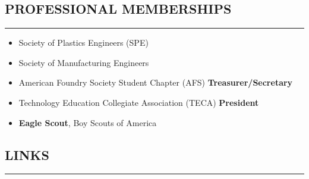 \documentclass[11pt,letterpaper]{article}
\begin{document}
\subsection*{PROFESSIONAL MEMBERSHIPS}
	\vspace{-0.5em}
	\hrule
	\vspace{0.8em}
	\begin{itemize}
		\item Society of Plastics Engineers (SPE)
		\item Society of Manufacturing Engineers
		\item American Foundry Society Student Chapter (AFS) \textbf{Treasurer/Secretary}
		\item Technology Education Collegiate Association (TECA) \textbf{President}
		\item \textbf{Eagle Scout}, Boy Scouts of America
	\end{itemize}
	
\subsection*{LINKS}
	\vspace{-0.5em}
	\hrule
	\vspace{-0.6em}
	
	\renewcommand{\theendnote}{ } %
	\theendnotes
	
\end{document}
